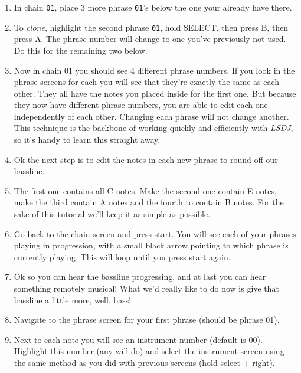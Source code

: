 \documentclass[]{article}
\newcommand{\buttonStyle}[1]{\textsf{#1}\xspace}
\newcommand{\bA}{\buttonStyle{A}}
\newcommand{\bB}{\buttonStyle{B}}
\newcommand{\bSelect}{\buttonStyle{{SELECT}}}
\newcommand{\nb}[1]{\texttt{#1}\xspace}
\newcommand{\lsdj}{\textit{LSDJ}\xspace}
\begin{document}
\begin{enumerate}[resume]

\item In chain \nb{01}, place 3 more phrase \nb{01}'s below the one your already have there.

\item To \textit{clone}, highlight the second phrase \nb{01}, hold \bSelect, then press \bB, then press \bA. The phrase number will change to one you've previously not used. Do this for the remaining two below.

\item Now in chain 01 you should see 4 different phrase numbers. If you look in the phrase screens for each you will see that they're exactly the same as each other. They all have the notes you placed inside for the first one. But because they now have different phrase numbers, you are able to edit each one independently of each other. Changing each phrase will not change another. This technique is the backbone of working quickly and efficiently with \lsdj, so it's handy to learn this straight away.

\item Ok the next step is to edit the notes in each new phrase to round off our bassline.

\item The first one contains all C notes. Make the second one contain E notes, make the third contain A notes and the fourth to contain B notes. For the sake of this tutorial we'll keep it as simple as possible.

\item Go back to the chain screen and press start. You will see each of your phrases playing in progression, with a small black arrow pointing to which phrase is currently playing. This will loop until you press start again.

\item Ok so you can hear the bassline progressing, and at last you can hear something remotely musical! What we'd really like to do now is give that bassline a little more, well, bass!

\item Navigate to the phrase screen for your first phrase (should be phrase 01).

\item Next to each note you will see an instrument number (default is 00). Highlight this number (any will do) and select the instrument screen using the same method as you did with previous screens (hold select + right).


\end{enumerate}
\end{document}
